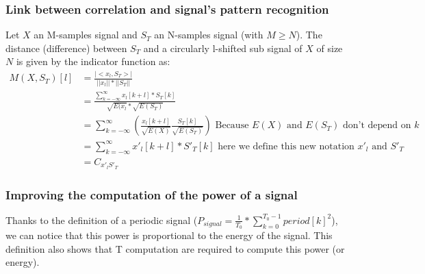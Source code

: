 \documentclass[a4paper]{article}
\begin{document}
			\subsubsection{Link between correlation and signal's pattern recognition}
Let $X$ an M-samples signal and $S_{T}$ an N-samples signal (with $M \geq N$).   The distance (difference) between $S_{T}$ and a circularly l-shifted sub signal of $X$ of size $N$ is given by the indicator function as:
\begin{equation*}
\label{M_equal_C}
\begin{aligned}
    M(X, S_{T})[l]	&= \frac{|<x_{l}, S_{T}>|}{||x_{l}|| * ||S_{T}|| } \\
    				&= \frac{\sum_{k=-\infty}^{\infty}{x_{l}[k+l]*S_{T}[k]}}{\sqrt{E(x_{l}} * \sqrt{E(S_{T})}}\\
    				&= \sum_{k=-\infty}^{\infty}{(\frac{x_{l}[k+l]}{\sqrt{E(X)}} \frac{S_{T}[k]}{\sqrt{E(S_{T})}})} \mbox{ Because } E(X) \mbox{ and } E(S_{T}) \mbox{ don't depend on } k\\
                    &= \sum_{k=-\infty}^{\infty}{x'_{l}[k+l] * S'_{T}[k]} \mbox{ here we define this new notation $x'_{l}$ and $S'_{T}$} \\
                    &= C_{x'_{l}S'_{T}}
\end{aligned}
\end{equation*}




		\subsubsection{Improving the computation of the power of a signal}
Thanks to the definition of a periodic signal ($P_{signal} = \frac{1}{T_{0}} * \sum_{k=0}^{T_{0}-1}{period[k]^2}$), we can notice that this power is proportional to the energy of the signal.   This definition also shows that T computation are required to compute this power (or energy).\\
\end{document}
